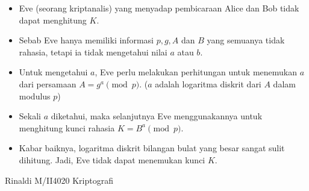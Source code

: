 \documentclass{article}
\begin{document}

\begin{itemize}
  \item Eve (seorang kriptanalis) yang menyadap pembicaraan Alice dan Bob tidak dapat menghitung $K$.
  \item Sebab Eve hanya memiliki informasi $p, g, A$ dan $B$ yang semuanya tidak rahasia, tetapi ia tidak mengetahui nilai $a$ atau $b$.
  \item Untuk mengetahui $a$, Eve perlu melakukan perhitungan untuk menemukan $a$ dari persamaan $A = g^a \pmod{p}$. ($a$ adalah logaritma diskrit dari $A$ dalam modulus $p$)
  \item Sekali $a$ diketahui, maka selanjutnya Eve menggunakannya untuk menghitung kunci rahasia $K = B^a \pmod{p}$.
  \item Kabar baiknya, logaritma diskrit bilangan bulat yang besar sangat sulit dihitung. Jadi, Eve tidak dapat menemukan kunci $K$.
\end{itemize}

\vfill
\centering Rinaldi M/II4020 Kriptografi
\end{document}
